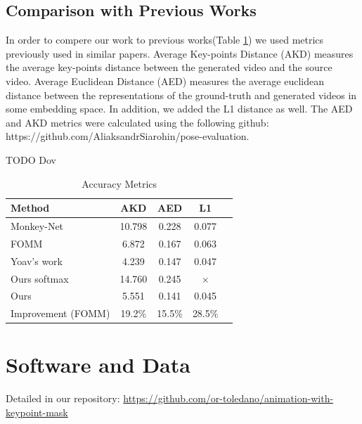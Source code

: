 \documentclass{article}
\begin{document}
\subsection{Comparison with Previous Works}
In order to compere our work to previous works(Table \ref{table:results}) we used metrics previously used in similar papers. Average Key-points Distance \cite{cao2017realtime} (AKD) measures the average key-points distance between the generated video and the source video. Average Euclidean Distance \cite{zheng2019joint}  (AED) measures the average euclidean distance
 between the representations of the ground-truth and generated videos in some embedding space. In addition, we added the L1 distance as well. The AED and AKD metrics were calculated using the following github: https://github.com/AliaksandrSiarohin/pose-evaluation.


\label{results}
TODO Dov

\begin{table}[t]
\caption{Accuracy Metrics}
\label{table:results}
\vskip 0.15in
\begin{center}
\begin{small}
\begin{sc}
\begin{tabular}{lcccr}
\toprule
Method & AKD & AED & L1 \\
\midrule
Monkey-Net    & 10.798 & 0.228 & 0.077 \\
FOMM    & 6.872 & 0.167 & 0.063 \\
Yoav's work & 4.239 & 0.147 & 0.047 \\
Ours softmax & 14.760& 0.245 & $\times$ \\
Ours & 5.551 & 0.141 &  0.045\\
\midrule
Improvement (FOMM)    & 19.2\% & 15.5\% & 28.5\% \\
\bottomrule
\end{tabular}
\end{sc}
\end{small}
\end{center}
\vskip -0.1in
\end{table}

\section*{Software and Data}
Detailed in our repository:
{\footnotesize
\url{https://github.com/or-toledano/animation-with-keypoint-mask}
}



\end{document}
